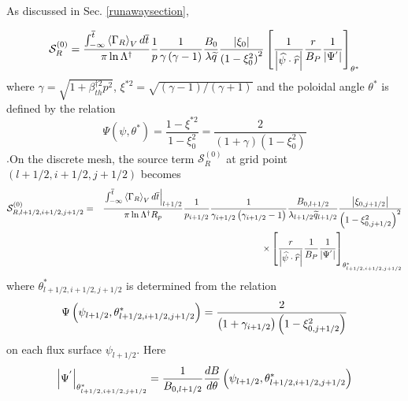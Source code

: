 As discussed in Sec. \ref{runawaysection},

\begin{equation}
\mathcal{S}_{R}^{\left( 0\right) }=\frac{\int_{-\infty }^{\overline{t}%
}\left\langle \Gamma _{R}\right\rangle _{V}d\overline{t}}{\pi \ln \Lambda
^{\dag }}\frac{1}{p}\frac{1}{\gamma \left( \gamma -1\right) }\frac{B_{0}}{%
\lambda \widetilde{q}}\frac{\left| \xi _{0}\right| }{\left( 1-\xi
_{0}^{2}\right) ^{2}}\left[ \frac{1}{\left| \widehat{\psi }\cdot \widehat{r}%
\right| }\frac{r}{B_{P}}\frac{1}{\left| \Psi ^{^{\prime }}\right| }\right]
_{\theta ^{*}}
\end{equation}
where $\gamma =\sqrt{1+\beta _{th}^{\dag 2}p^{2}}$, $\xi ^{*2}=\sqrt{\left(
\gamma -1\right) /\left( \gamma +1\right) }$ and the poloidal angle $\theta
^{*}$ is defined by the relation 
\begin{equation}
\Psi \left( \psi ,\theta ^{*}\right) =\frac{1-\xi ^{*2}}{1-\xi _{0}^{2}}=%
\frac{2}{\left( 1+\gamma \right) \left( 1-\xi _{0}^{2}\right) }
\end{equation}
$.$On the discrete mesh, the source term $\mathcal{S}_{R}^{\left( 0\right) } 
$ at grid point $\left( l+1/2,i+1/2,j+1/2\right) $ becomes 
\begin{eqnarray}
\mathcal{S}_{R,l+1/2,i+1/2,j+1/2}^{\left( 0\right) } &=&\frac{\left.
\int_{-\infty }^{\overline{t}}\left\langle \Gamma _{R}\right\rangle _{V}d%
\overline{t}\right| _{l+1/2}}{\pi \ln \Lambda ^{\dag }R_{p}}\frac{1}{%
p_{i+1/2}}\frac{1}{\gamma _{i+1/2}\left( \gamma _{i+1/2}-1\right) }\frac{%
B_{0,l+1/2}}{\lambda _{l+1/2}\widetilde{q}_{l+1/2}}\frac{\left| \xi
_{0,j+1/2}\right| }{\left( 1-\xi _{0,j+1/2}^{2}\right) ^{2}}  \notag \\
&&\times \left[ \frac{r}{\left| \widehat{\psi }\cdot \widehat{r}\right| }%
\frac{1}{B_{P}}\frac{1}{\left| \Psi ^{^{\prime }}\right| }\right] _{\theta
_{l+1/2,i+1/2,j+1/2}^{*}}
\end{eqnarray}
where $\theta _{l+1/2,i+1/2,j+1/2}^{*}$ is determined from the relation 
\begin{equation}
\Psi \left( \psi _{l+1/2},\theta _{l+1/2,i+1/2,j+1/2}^{*}\right) =\frac{2}{%
\left( 1+\gamma _{i+1/2}\right) \left( 1-\xi _{0,j+1/2}^{2}\right) }
\end{equation}
on each flux surface $\psi _{l+1/2}.$ Here 
\begin{equation}
\left| \Psi ^{^{\prime }}\right| _{\theta _{l+1/2,i+1/2,j+1/2}^{*}}=\frac{1}{%
B_{0,l+1/2}}\frac{dB}{d\theta }\left( \psi _{l+1/2},\theta
_{l+1/2,i+1/2,j+1/2}^{*}\right)
\end{equation}

